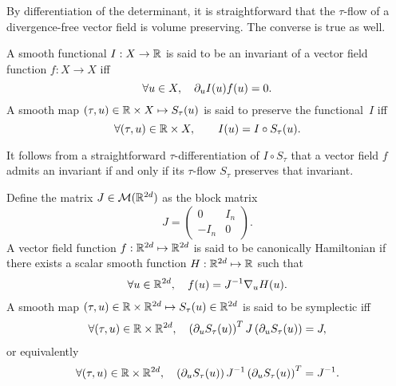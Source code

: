 \begin{remark}
  By differentiation of the determinant, it is straightforward that the
  $\tau$-flow of a divergence-free vector field is volume preserving. The
  converse is true as well. 
\end{remark}


\begin{definition}
  A smooth functional $I: X \rightarrow \mathbb{R}$ is said to be an
  invariant of a vector field function $f: X \rightarrow X$ iff
  \begin{equation*}
    \forall u \in X, \quad \partial_u I(u) f(u) = 0 .
  \end{equation*}
  A smooth map $(\tau, u) \in \mathbb{R} \times X \mapsto S_\tau(u)$ is said
  to preserve the functional~$I$ iff
  \begin{equation*}
    \forall (\tau, u) \in \mathbb{R} \times X, \qquad
    I(u) = I \circ S_\tau (u) .
  \end{equation*}
\end{definition}

\begin{remark}
  It follows from a straightforward $\tau$-differentiation of $I \circ
  S_{\tau}$ that a vector field $f$ admits an invariant if and only if
  its $\tau$-flow $S_\tau$ preserves that invariant.  
\end{remark}


\begin{definition}
  Define the matrix $J \in {\cal M}(\mathbb{R}^{2d})$ as the block matrix
  $$
  J = \left(
  \begin{array}{cc}
    0 & I_n \\
    -I_n & 0
  \end{array}
  \right).
  $$
  A vector field function $f:\mathbb{R}^{2d} \mapsto \mathbb{R}^{2d}$ is said to be
  canonically  Hamiltonian if there exists a scalar smooth function
  $H:\mathbb{R}^{2d} \mapsto \mathbb{R}$ such that 
  \begin{align*}
    \forall u \in \mathbb{R}^{2d}, \quad f(u) = J^{-1} \nabla_u H(u).
  \end{align*}
  A smooth map $(\tau,u) \in \mathbb{R} \times \mathbb{R}^{2d} \mapsto  S_\tau(u) \in
  \mathbb{R}^{2d}$ is said to be symplectic iff
  \begin{align} \label{def:symplectif} %
    \forall (\tau, u) \in \R \times \R^{2d}, \quad 
    \left(\partial_u S_\tau(u)\right)^T J \left(\partial_u S_\tau(u)\right) = J,
  \end{align}
  or equivalently
  \begin{align} %
    \forall (\tau, u) \in \R \times \R^{2d}, \quad 
    \left(\partial_u S_\tau(u)\right) J^{-1} \left(\partial_u S_\tau(u)\right)^T = J^{-1} .
  \end{align}
\end{definition}


